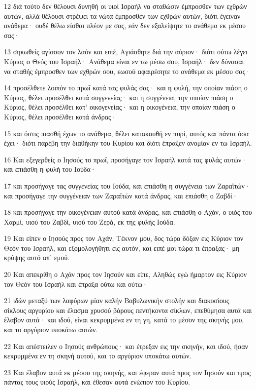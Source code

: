 \par 12 διά τούτο δεν θέλουσι δυνηθή οι υιοί Ισραήλ να σταθώσιν έμπροσθεν των εχθρών αυτών, αλλά θέλουσι στρέψει τα νώτα έμπροσθεν των εχθρών αυτών, διότι έγειναν ανάθεμα· ουδέ θέλω είσθαι πλέον με σας, εάν δεν εξαλείψητε το ανάθεμα εκ μέσου σας·
\par 13 σηκωθείς αγίασον τον λαόν και ειπέ, Αγιάσθητε διά την αύριον· διότι ούτω λέγει Κύριος ο Θεός του Ισραήλ· Ανάθεμα είναι εν τω μέσω σου, Ισραήλ· δεν δύνασαι να σταθής έμπροσθεν των εχθρών σου, εωσού αφαιρέσητε το ανάθεμα εκ μέσου σας·
\par 14 προσέλθετε λοιπόν το πρωΐ κατά τας φυλάς σας· και η φυλή, την οποίαν πιάση ο Κύριος, θέλει προσέλθει κατά συγγενείας· και η συγγένεια, την οποίαν πιάση ο Κύριος, θέλει προσέλθει κατ' οικογενείας· και η οικογένεια, την οποίαν πιάση ο Κύριος, θέλει προσέλθει κατά άνδρας·
\par 15 και όστις πιασθή έχων το ανάθεμα, θέλει κατακαυθή εν πυρί, αυτός και πάντα όσα έχει· διότι παρέβη την διαθήκην του Κυρίου και διότι έπραξεν ανομίαν εν τω Ισραήλ.
\par 16 Και εξεγερθείς ο Ιησούς το πρωΐ, προσήγαγε τον Ισραήλ κατά τας φυλάς αυτών· και επιάσθη η φυλή του Ιούδα·
\par 17 και προσήγαγε τας συγγενείας του Ιούδα, και επιάσθη η συγγένεια των Ζαραϊτών· και προσήγαγε την συγγένειαν των Ζαραϊτών κατά άνδρας, και επιάσθη ο Ζαβδί·
\par 18 και προσήγαγε την οικογένειαν αυτού κατά άνδρας, και επιάσθη ο Αχάν, ο υιός του Χαρμί, υιού του Ζαβδί, υιού του Ζερά, εκ της φυλής Ιούδα.
\par 19 Και είπεν ο Ιησούς προς τον Αχάν, Τέκνον μου, δος τώρα δόξαν εις Κύριον τον Θεόν του Ισραήλ, και εξομολογήθητι εις αυτόν, και ειπέ μοι τώρα τι έπραξας· μη κρύψης αυτό απ' εμού.
\par 20 Και απεκρίθη ο Αχάν προς τον Ιησούν και είπε, Αληθώς εγώ ήμαρτον εις Κύριον τον Θεόν του Ισραήλ και έπραξα ούτω και ούτω·
\par 21 ιδών μεταξύ των λαφύρων μίαν καλήν Βαβυλωνικήν στολήν και διακοσίους σίκλους αργυρίου και έλασμα χρυσού βάρους πεντήκοντα σίκλων, επεθύμησα αυτά και έλαβον αυτά· και ιδού, είναι κεκρυμμένα εν τη γη, κατά το μέσον της σκηνής μου, και το αργύριον υποκάτω αυτών.
\par 22 Και απέστειλεν ο Ιησούς ανθρώπους· και έτρεξαν εις την σκηνήν, και ιδού, ήσαν κεκρυμμένα εν τη σκηνή αυτού, και το αργύριον υποκάτω αυτών.
\par 23 Και έλαβον αυτά εκ μέσου της σκηνής, και έφεραν αυτά προς τον Ιησούν και προς πάντας τους υιούς Ισραήλ, και έθεσαν αυτά ενώπιον του Κυρίου.
